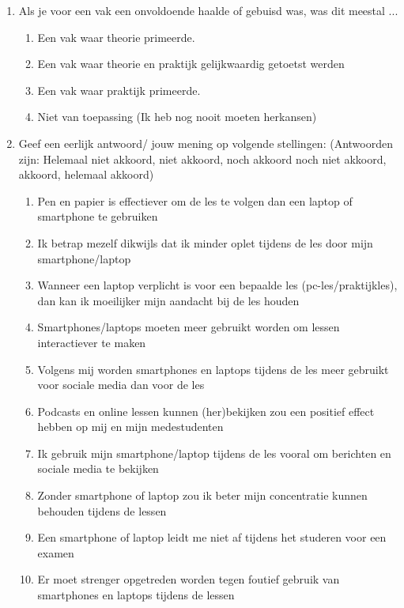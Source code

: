 \begin{enumerate}
	\item Als je voor een vak een onvoldoende haalde of gebuisd was, was dit meestal ...
	\begin{enumerate}
		\item Een vak waar theorie primeerde.
		\item Een vak waar theorie en praktijk gelijkwaardig getoetst werden
		\item Een vak waar praktijk primeerde.
		\item Niet van toepassing (Ik heb nog nooit moeten herkansen)
	\end{enumerate}
	\item Geef een eerlijk antwoord/ jouw mening op volgende stellingen: (Antwoorden zijn: Helemaal niet akkoord, niet akkoord, noch akkoord noch niet akkoord, akkoord, helemaal akkoord)
	\begin{enumerate}
		\item Pen en papier is effectiever om de les te volgen dan een laptop of smartphone te gebruiken
		\item Ik betrap mezelf dikwijls dat ik minder oplet tijdens de les door mijn smartphone/laptop
		\item Wanneer een laptop verplicht is voor een bepaalde les (pc-les/praktijkles), dan kan ik moeilijker mijn aandacht bij de les houden
		\item Smartphones/laptops moeten meer gebruikt worden om lessen interactiever te maken
		\item Volgens mij worden smartphones en laptops tijdens de les meer gebruikt voor sociale media dan voor de les
		\item Podcasts en online lessen kunnen (her)bekijken zou een positief effect hebben op mij en mijn medestudenten
		\item Ik gebruik mijn smartphone/laptop tijdens de les vooral om berichten en sociale media te bekijken
		\item Zonder smartphone of laptop zou ik beter mijn concentratie kunnen behouden tijdens de lessen
		\item Een smartphone of laptop leidt me niet af tijdens het studeren voor een examen
		\item Er moet strenger opgetreden worden tegen foutief gebruik van smartphones en laptops tijdens de lessen
	\end{enumerate}
\end{enumerate}


